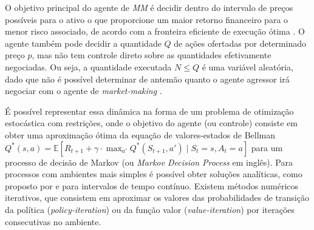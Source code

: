 O objetivo principal do agente de \textit{MM} é decidir dentro do intervalo de preços possíveis para o ativo o que proporcione um maior retorno financeiro para o menor risco associado, de acordo com a fronteira eficiente de execução ótima \citep{almgren2000}. O agente também pode decidir a quantidade $Q$ de ações ofertadas por determinado preço $p$, mas não tem controle direto sobre as quantidades efetivamente negociadas. Ou seja, a quantidade executada $N \leq Q$ é uma variável aleatória, dado que não é possível determinar de antemão quanto o agente agressor irá negociar com o agente de \textit{market-making} \citep{rao2020stochastic}.

É possível representar essa dinâmica na forma de um problema de otimização estocástica com restrições, onde o objetivo do agente (ou controle) consiste em obter uma aproximação ótima da equação de valores-estados de Bellman $Q^*(s, a) = \mathbb{E} \left[ R_{t+1} + \gamma \cdot \max_{a'} Q^*(S_{t+1}, a') \mid S_t = s, A_t = a \right]$ para um processo de decisão de Markov (ou \textit{Markov Decision Process} em inglês). Para processos com ambientes mais simples é possível obter soluções analíticas, como proposto por \citep{Avellaneda2008} e \citep{rao2020stochastic} para intervalos de tempo contínuo. Existem métodos numéricos iterativos, que consistem em aproximar os valores das probabilidades de transição da política (\textit{policy-iteration}) ou da função valor (\textit{value-iteration}) por iterações consecutivas no ambiente.

